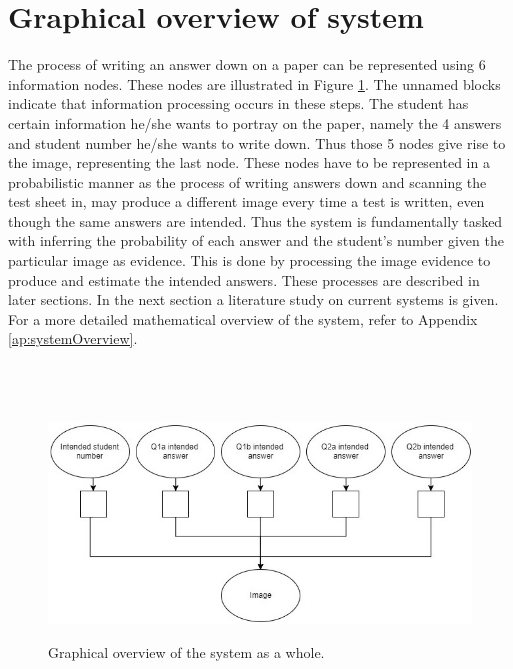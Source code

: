 \section{Graphical overview of system}
The process of writing an answer down on a paper can be represented using 6 information nodes. These nodes are illustrated in Figure \ref{fig:systemOverviewIntro}. The unnamed blocks indicate that information processing occurs in these steps. The student has certain information he/she wants to portray on the paper, namely the 4 answers and student number he/she wants to write down. Thus those 5 nodes give rise to the image, representing the last node. These nodes have to be represented in a probabilistic manner as the process of writing answers down and scanning the test sheet in, may produce a different image every time a test is written, even though the same answers are intended. Thus the system is fundamentally tasked with inferring the probability of each answer and the student's number given the particular image as evidence. This is done by processing the image evidence to produce and estimate the intended answers. These processes are described in later sections. In the next section a literature study on current systems is given. For a more detailed mathematical overview of the system, refer to Appendix \ref{ap:systemOverview}.
\\
\\
\\
\\
\begin{figure}[H]
  \centering
  \includegraphics[width=13cm]{systemOverview}\\
  \caption{Graphical overview of the system as a whole.}
  \label{fig:systemOverviewIntro}
\end{figure}


